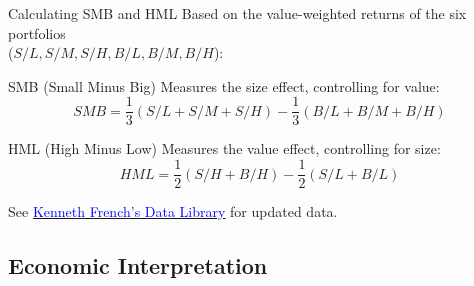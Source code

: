 \documentclass{beamer}
\begin{document}
\begin{frame}{Calculating SMB and HML}
	Based on the value-weighted returns of the six portfolios\\ ($S/L, S/M, S/H, B/L, B/M, B/H$):
	
	\begin{block}{SMB (Small Minus Big)}
		Measures the size effect, controlling for value:
		$$ SMB = \frac{1}{3}(S/L + S/M + S/H) - \frac{1}{3}(B/L + B/M + B/H) $$
	\end{block}
	
	\begin{block}{HML (High Minus Low)}
		Measures the value effect, controlling for size:
		$$ HML = \frac{1}{2}(S/H + B/H) - \frac{1}{2}(S/L + B/L) $$
	\end{block}
	
	\footnotesize
	See \href{https://mba.tuck.dartmouth.edu/pages/faculty/ken.french/data_library.html}{\textcolor{blue}{Kenneth French's Data Library}} for updated data.
\end{frame}

\subsection{Economic Interpretation}
\end{document}
